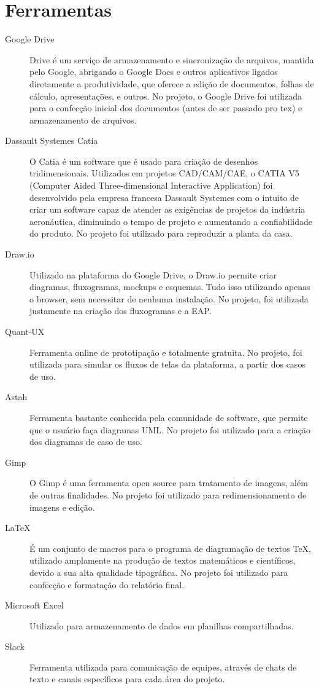 \chapter{Ferramentas}
\begin{description}
    \item[Google Drive] Drive é um serviço de armazenamento e sincronização de arquivos, mantida pelo Google, abrigando o Google Docs e outros aplicativos ligados diretamente a produtividade, que oferece a edição de documentos, folhas de cálculo, apresentações, e outros. No projeto, o Google Drive foi utilizada para o confecção inicial dos documentos (antes de ser passado pro tex) e armazenamento de arquivos.
    \item[Dassault Systemes Catia] O Catia é um software que é usado para criação de desenhos tridimensionais. Utilizados em projetos CAD/CAM/CAE, o CATIA V5 (Computer Aided Three-dimensional Interactive Application) foi desenvolvido pela empresa francesa Dassault Systemes com o intuito de criar um software capaz de atender as exigências de projetos da indústria aeronáutica, diminuindo o tempo de projeto e aumentando a confiabilidade do produto. No projeto foi utilizado para reproduzir a planta da casa.
    \item[Draw.io] Utilizado na plataforma do Google Drive, o Draw.io permite criar diagramas, fluxogramas, mockups e esquemas. Tudo isso utilizando apenas o browser, sem necessitar de nenhuma instalação. No projeto, foi utilizada justamente na criação dos fluxogramas e a EAP.
    \item[Quant-UX] Ferramenta online de prototipação e totalmente gratuita. No projeto, foi utilizada para simular os fluxos de telas da plataforma, a partir dos casos de uso.
    \item[Astah] Ferramenta bastante conhecida pela comunidade de software, que permite que o usuário faça diagramas UML. No projeto foi utilizado para a criação dos diagramas de caso de uso.
    \item[Gimp] O Gimp é uma ferramenta open source para tratamento de imagens, além de outras finalidades. No projeto foi utilizado para redimensionamento de imagens e edição.
    \item[LaTeX] É um conjunto de macros para o programa de diagramação de textos TeX, utilizado amplamente na produção de textos matemáticos e científicos, devido a sua alta qualidade tipográfica. No projeto foi utilizado para confecção e formatação do relatório final.
    \item[Microsoft Excel] Utilizado para armazenamento de dados em planilhas compartilhadas.
    \item[Slack] Ferramenta utilizada para comunicação de equipes, através de chats de texto e canais específicos para cada área do projeto.
\end{description}
